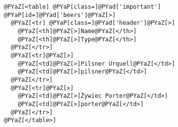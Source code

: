 \begin{Verbatim}[commandchars=@\[\]]
@PYaZ[<table] @PYaP[class=]@PYad['important'] @PYaP[id=]@PYad['beers']@PYaZ[>]
  @PYaZ[<tr] @PYaP[class=]@PYad['header']@PYaZ[>]
    @PYaZ[<th]@PYaZ[>]Name@PYaZ[</th>]
    @PYaZ[<th]@PYaZ[>]Type@PYaZ[</th>]
  @PYaZ[</tr>]
  @PYaZ[<tr]@PYaZ[>]
    @PYaZ[<td]@PYaZ[>]Pilsner Urquell@PYaZ[</td>]
    @PYaZ[<td]@PYaZ[>]pilsner@PYaZ[</td>]
  @PYaZ[</tr>]
  @PYaZ[<tr]@PYaZ[>]
    @PYaZ[<td]@PYaZ[>]Żywiec Porter@PYaZ[</td>]
    @PYaZ[<td]@PYaZ[>]porter@PYaZ[</td>]
  @PYaZ[</tr>]
@PYaZ[</table>]
\end{Verbatim}
